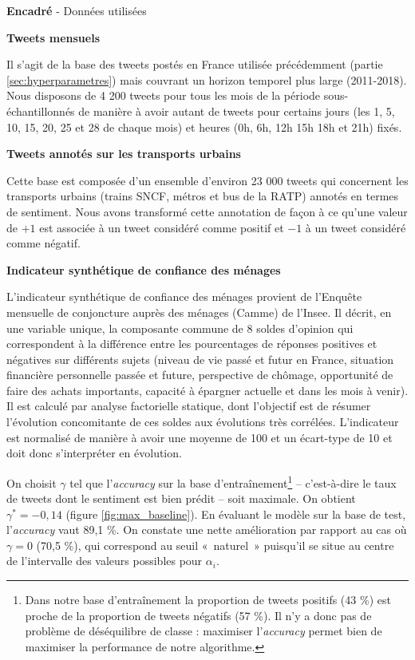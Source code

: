 \documentclass[11pt,french,french]{article}
\let\rmarkdownfootnote\footnote%
\def\footnote{\protect\rmarkdownfootnote}
\newcounter{comptEncadre}
\renewcommand\thecomptEncadre{%
\arabic{comptEncadre}}
\newenvironment{encadre}[2][false]{\refstepcounter{comptEncadre}
\begin{bclogo}[couleur=processblue!5,arrondi=0.1,
logo=\bcloupe,barre=none,couleurBord=blue!60!green,nobreak = #1]{ {\sc \textbf{Encadré \thecomptEncadre}} -  #2}
\smallskip
}{\end{bclogo}}
\begin{document}
\begin{encadre}[true]{Données utilisées}\label{enc:encadre1}

\small

\textbf{Tweets mensuels}

Il s'agit de la base des tweets postés en France utilisée précédemment (partie  \ref{sec:hyperparametres}) mais couvrant un horizon temporel plus large (2011-2018).
Nous disposons de 4 200 tweets pour tous les mois de la période sous-échantillonnés de manière à avoir autant de tweets pour certains jours (les 1, 5, 10, 15, 20, 25 et 28 de chaque mois) et heures (0h, 6h, 12h 15h 18h et 21h) fixés. 

\textbf{Tweets annotés sur les transports urbains}

Cette base est composée d'un ensemble d'environ 23 000 tweets qui concernent les transports urbains (trains SNCF, métros et bus de la RATP) annotés en termes de sentiment.
Nous avons transformé cette annotation de façon à ce qu'une valeur de $+1$ est associée à un tweet considéré comme positif et $-1$ à un tweet considéré comme négatif.


\textbf{Indicateur synthétique de confiance des ménages}

L’indicateur synthétique de confiance des ménages provient de l'Enquête mensuelle de conjoncture auprès des ménages (Camme) de l’Insee.
Il décrit, en une variable unique, la composante commune de 8 soldes d’opinion qui correspondent à la différence entre les pourcentages de réponses positives et négatives sur différents sujets (niveau de vie passé et futur en France, situation financière personnelle passée et future, perspective de chômage, opportunité de faire des achats importants, capacité à épargner actuelle et dans les mois à venir).
Il est calculé par analyse factorielle statique, dont l’objectif est de résumer l’évolution concomitante de ces soldes aux évolutions très corrélées.
L’indicateur est normalisé de manière à avoir une moyenne de 100 et un écart-type de 10 et doit donc s’interpréter en évolution. 

\end{encadre}

On choisit \(\gamma\) tel que l'\emph{accuracy} sur la base d'entraînement\footnote{Dans notre base d'entraînement la proportion de tweets positifs (43 \%) est proche de la proportion de tweets négatifs (57 \%).
  Il n'y a donc pas de problème de déséquilibre de classe : maximiser l'\emph{accuracy} permet bien de maximiser la performance de notre algorithme.} -- c'est-à-dire le taux de tweets dont le sentiment est bien prédit -- soit maximale. On obtient \(\gamma^* = -0,14\) (figure \ref{fig:max_baseline}).
En évaluant le modèle sur la base de test, l'\emph{accuracy} vaut 89,1 \%. On constate une nette amélioration par rapport au cas où \(\gamma = 0\) (70,5 \%), qui correspond au seuil «~naturel~» puisqu'il se situe au centre de l'intervalle des valeurs possibles pour \(\alpha_i\).
\end{document}
